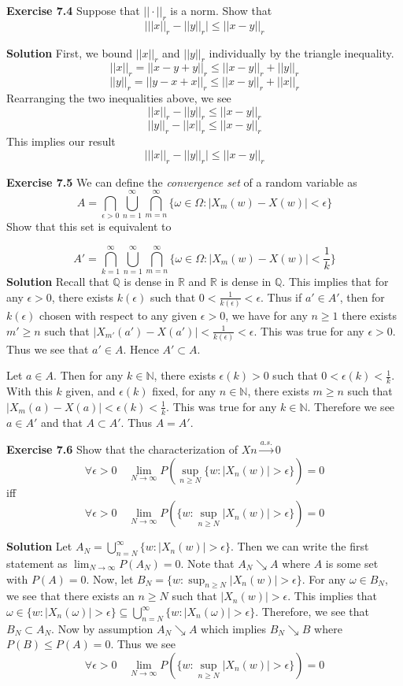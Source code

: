 \documentclass[12pt]{article}  %
\newcommand{\N}{{\mathbb{N}}}
\newcommand{\R}{{\mathbb{R}}}
\newcommand{\Q}{{\mathbb{Q}}}
\newcommand{\e}{{\epsilon}}
\begin{document}
\newpage

\textbf{Exercise 7.4} Suppose that $||\cdot||_r$ is a norm. Show that $$\Big|||x||_r - ||y||_r\Big|\leq ||x-y||_r$$

\textbf{Solution} First, we bound $||x||_r$ and $||y||_r$ individually by the triangle inequality. $$||x||_r = ||x-y +y||_r\leq ||x-y||_r + ||y||_r$$ $$||y||_r = ||y-x +x||_r\leq ||x-y||_r + ||x||_r$$ Rearranging the two inequalities above, we see $$||x||_r-||y||_r \leq ||x-y||_r$$$$||y||_r-||x||_r \leq ||x-y||_r$$ This implies our result $$\Big|||x||_r - ||y||_r\Big|\leq ||x-y||_r$$

\newpage

\textbf{Exercise 7.5} We can define the \textit{convergence set} of a random variable as $$A = \bigcap_{\e>0}\bigcup_{n=1}^{\infty}\bigcap_{m=n}^{\infty}\{\omega\in\Omega:|X_m(w)-X(w)|<\e\}$$ Show that this set is equivalent to 

$$A'=\bigcap_{k=1}^{\infty}\bigcup_{n=1}^{\infty}\bigcap_{m=n}^{\infty}\{\omega\in\Omega:|X_m(w)-X(w)|<\frac{1}{k}\}$$
\textbf{Solution} Recall that $\Q$ is dense in $\R$ and $\R$ is dense in $\Q$. This implies that for any $\e>0$, there exists $k(\e)$ such that $0<\frac{1}{k(\e)}<\e$. Thus if $a'\in A'$, then for $k(\e)$ chosen with respect to any given $\e>0$, we have for any $n\geq 1$ there exists $m'\geq n$ such that $|X_{m'}(a') - X(a')|<\frac{1}{k(\e)}<\e$. This was true for any $\e>0$. Thus we see that $a'\in A$. Hence $A'\subset A$.

Let $a\in A$. Then for any $k\in\N$, there exists $\e(k)>0$ such that $0<\e(k)<\frac{1}{k}$. With this $k$ given, and $\e(k)$ fixed, for any $n\in\N$, there exists $m\geq n$ such that $|X_{m}(a) - X(a)|<\e(k)<\frac{1}{k}$. This was true for any $k\in\N$. Therefore we see $a\in A'$ and that $A\subset A'$. Thus $A=A'$. 

\newpage

\textbf{Exercise 7.6} Show that the characterization of $Xn\overset{a.s.}{\to}0$ $$\forall\e>0\hspace{1em} \lim_{N\to\infty}P(\sup_{n\geq N}\{w:|X_n(w)|>\e\})= 0$$ iff $$\forall\e>0\hspace{1em} \lim_{N\to\infty}P(\{w:\sup_{n\geq N}|X_n(w)|>\e\})= 0$$

\textbf{Solution} Let $A_N = \bigcup_{n=N}^{\infty}\{w:|X_n(w)|>\e\}$. Then we can write the first statement as $\lim_{N\to\infty}P(A_N) = 0$. Note that $A_N\searrow A$ where $A$ is some set with $P(A) = 0$. Now, let $B_N = \{w: \sup_{n\geq N}|X_n(w)|>\e\}$. For any $\omega\in B_N$, we see that there exists an $n\geq N$ such that $|X_n(w)|>\e$. This implies that $\omega\in\{w:|X_n(\omega)|>\e\}\subseteq \bigcup_{n=N}^{\infty}\{w:|X_n(\omega)|>\e\}$. Therefore, we see that $B_N\subset A_N$. Now by assumption $A_N\searrow A$ which implies $B_N\searrow B$ where $P(B)\leq P(A) = 0$. Thus we see $$\forall\e>0\hspace{1em} \lim_{N\to\infty}P(\{w:\sup_{n\geq N}|X_n(w)|>\e\})= 0$$
\end{document}
